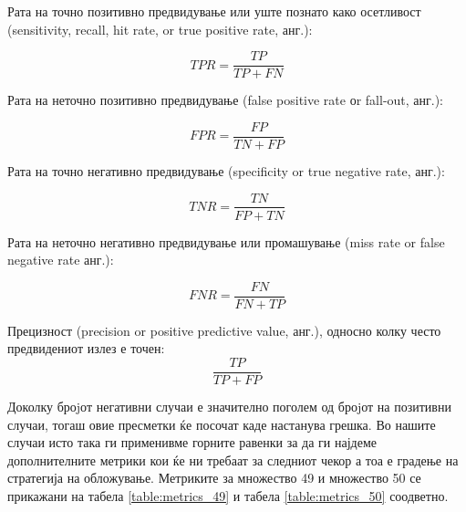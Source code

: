 Рата на точно позитивно предвидување или уште познато како осетливост (sensitivity, recall, hit rate, or true positive rate, анг.):

\begin{equation}
TPR = \frac{TP}{TP + FN}
\end{equation}

Рата на неточно позитивно предвидување (false positive rate оr fall-out, анг.):

\begin{equation}
FPR = \frac{FP}{TN + FP}
\end{equation}

Рата на точно негативно предвидување (specificity or true negative rate, анг.):

\begin{equation}
TNR = \frac{TN}{FP +TN}
\end{equation}

Рата на неточно негативно предвидување или промашување (miss rate or false
negative rate анг.):

\begin{equation}
FNR = \frac{FN}{FN + TP}
\end{equation}


Прецизност (precision or positive predictive value, анг.), односно колку често предвидениот излез е точен:
\begin{equation}
\frac{TP}{TP + FP}
\end{equation}

Доколку броjот негативни случаи е значително поголем од броjот на позитивни случаи, тогаш овие пресметки ќе посочат каде настанува грешка.
Во нашите случаи исто така ги применивме горните равенки за да ги најдеме дополнителните метрики кои ќе ни требаат за следниот чекор а тоа е градење на стратегија на обложување. Метриките за множество 49 и множество 50 се прикажани на табела \ref{table:metrics_49} и табела \ref{table:metrics_50} соодветно.

\begin{table}[H]
 \centering
\caption{Изведени метрики од матрица на забуни за множество 49}
\label{table:metrics_49}
\end{table}

